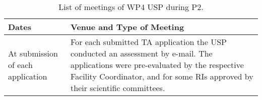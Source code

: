 \begin{table}[H]
\caption{List of meetings of WP4 USP during P2.}
\centering
\begin{tabular}{|L{0.2\textwidth}|C{0.8\textwidth}|} \hline
    {\bf Dates} & {\bf Venue and Type of Meeting} \\ \hline
    At submission of each application & For each submitted TA application the USP conducted an assessment by e-mail. The applications were pre-evaluated by the respective Facility Coordinator, and for some RIs approved by their scientific committees. \\ \hline 
\end{tabular}
\label{tab:usp-wp4-meet}
\end{table}